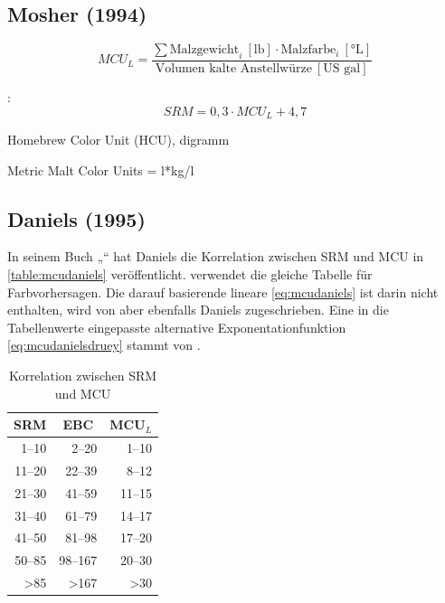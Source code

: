 \documentclass[a4paper,parskip=half]{scrartcl}
\newcommand{\MCUL}{\mathit{MCU}_{L}}
\newcommand{\SRM}{\mathit{SRM}}
\newcommand{\ulovi}{\:[\textrm{°L}]}
\newcommand{\ugal}{\:[\textrm{US gal}]}
\newcommand{\ulb}{\:[\textrm{lb}]}
\begin{document}
\subsection*{Mosher (1994)}

\begin{equation}
\MCUL = \frac{\sum \text{Malzgewicht}_i \ulb \cdot \text{Malzfarbe}_i \ulovi}{\text{Volumen kalte Anstellwürze} \ugal} 
\label{eq:mcubasis}
\end{equation}

\parencite{Morey2004}:
\begin{equation}
\SRM = 0,3 \cdot \MCUL + 4,7
\label{eq:mcumosher}
\end{equation}

Homebrew Color Unit (HCU), digramm
\parencite[34]{Mosher1994}

Metric Malt Color Units = l*kg/l
\parencite[258]{Mosher2015}

\subsection*{Daniels (1995)}

In seinem Buch „“ hat Daniels die Korrelation zwischen SRM und MCU in \autoref{table:mcudaniels} veröffentlicht. \textcite[10]{Holle2010} verwendet die gleiche Tabelle für Farbvorhersagen. Die darauf basierende lineare \autoref{eq:mcudaniels} ist darin nicht enthalten, wird von \textcite{Morey2004} aber ebenfalls Daniels zugeschrieben. Eine in die Tabellenwerte eingepasste alternative Exponentationfunktion \autoref{eq:mcudanielsdruey} stammt von \textcite{Druey1998}.

\begin{table}[H]
\centering
\begin{tabular}{rrr}
\toprule
\multicolumn{1}{c}{\textbf{SRM}} & \multicolumn{1}{c}{\textbf{EBC}} & \multicolumn{1}{c}{\textbf{MCU$_L$}} \\
\midrule
1–10 & 2–20 & 1–10 \\
11–20 & 22–39 & 8–12 \\
21–30 & 41–59 & 11–15 \\
31–40 & 61–79 & 14–17 \\
41–50 & 81–98 & 17–20 \\
50–85 & 98–167 & 20–30 \\
>85 & >167 & >30 \\
\bottomrule
\end{tabular}
\caption{Korrelation zwischen SRM und MCU \parencite[61]{Daniels1996}}
\label{table:mcudaniels}
\end{table}
\end{document}
